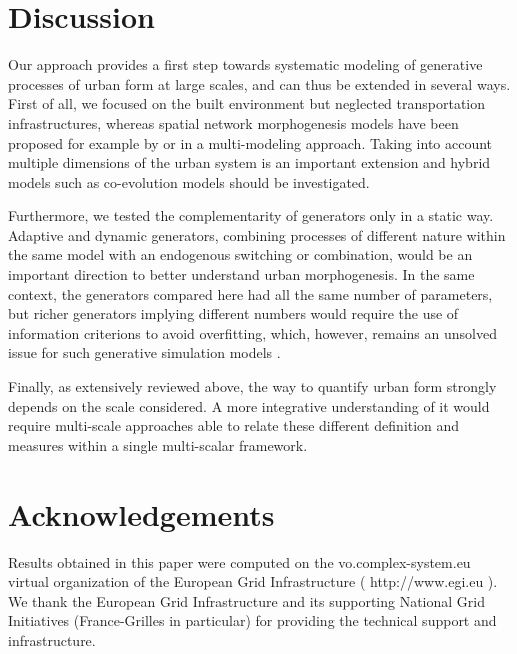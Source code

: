 \documentclass[letterpaper]{article}
\begin{document}
\section{Discussion} \label{sec:discussion}


Our approach provides a first step towards systematic modeling of generative processes of urban form at large scales, and can thus be extended in several ways.
First of all, we focused on the built environment but neglected transportation infrastructures, whereas spatial network morphogenesis models have been proposed for example by \cite{courtat2011mathematics} or \cite{raimbault2018multi} in a multi-modeling approach.
Taking into account multiple dimensions of the urban system is an important extension and hybrid models such as co-evolution models \citep{raimbault2014hybrid} should be investigated.

Furthermore, we tested the complementarity of generators only in a static way. Adaptive and dynamic generators, combining processes of different nature within the same model with an endogenous switching or combination, would be an important direction to better understand urban morphogenesis.
In the same context, the generators compared here had all the same number of parameters, but richer generators implying different numbers would require the use of information criterions to avoid overfitting, which, however, remains an unsolved issue for such generative simulation models \citep{piou2009proposing}.

Finally, as extensively reviewed above, the way to quantify urban form strongly depends on the scale considered. A more integrative understanding of it would require multi-scale approaches able to relate these different definition and measures within a single multi-scalar framework.








\section{Acknowledgements}

Results obtained in this paper were computed on the vo.complex-system.eu virtual organization of the European Grid Infrastructure ( http://www.egi.eu ). We thank the European Grid Infrastructure and its supporting National Grid Initiatives (France-Grilles in particular) for providing the technical support and infrastructure.

\footnotesize

\end{document}

